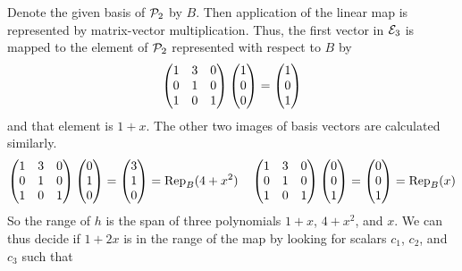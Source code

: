 \begin{exercises}
\begin{equation*}
     \end{equation*}
     \begin{answer}
       Denote the given basis of
       $\polyspace_2$
       by $B$.
       Then application of the linear map is represented by matrix-vector 
       multiplication.
       Thus, the first vector in $\stdbasis_3$ is mapped to the element
       of $\polyspace_2$ represented with respect to $B$ by
       \begin{equation*}
       \begin{pmatrix}
         1  &3  &0  \\
         0  &1  &0  \\
         1  &0  &1
       \end{pmatrix}
       \colvec{1 \\ 0 \\ 0}
       =
       \colvec{1 \\ 0 \\ 1}  
       \end{equation*}
       and that element is $1+x$.
       The other two images of basis vectors are calculated similarly.
       \begin{equation*}
         \begin{pmatrix}
           1  &3  &0  \\
           0  &1  &0  \\
           1  &0  &1
         \end{pmatrix}
         \colvec{0 \\ 1 \\ 0}
         =
         \colvec{3 \\ 1 \\ 0}=\rep{4+x^2}{B}
         \quad
         \begin{pmatrix}
           1  &3  &0  \\
           0  &1  &0  \\
           1  &0  &1
         \end{pmatrix}
         \colvec{0 \\ 0 \\ 1}
         =
         \colvec{0 \\ 0 \\ 1}=\rep{x}{B}
       \end{equation*}
       So the range of $h$ is the span of three polynomials 
       $1+x$, $4+x^2$, and $x$. 
       We can thus decide if $1+2x$ is in the range of the map by 
       looking for scalars $c_1$, $c_2$, and $c_3$ such that
       \begin{equation*}

\end{equation*}
\end{answer}
\end{exercises}

